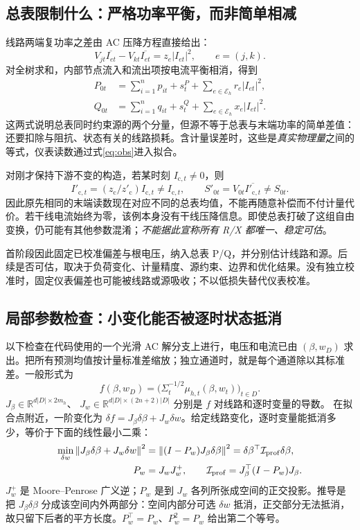 \documentclass[UTF8,fontset=fandol,11pt,a4paper]{ctexart}
\newcommand{\R}{\mathbb R}
\newcommand{\norm}[1]{\left\lVert#1\right\rVert}
\begin{document}
\subsection{总表限制什么：严格功率平衡，而非简单相减}
线路两端复功率之差由 AC 压降方程直接给出：
\begin{equation}
 V_{jt}\overline{I_{et}}-V_{kt}\overline{I_{et}}
       =z_e|I_{et}|^2,\qquad e=(j,k).
 \label{eq:edgepower}
\end{equation}
对全树求和，内部节点流入和流出项按电流平衡相消，得到
\begin{align}
 P_{0t}&=\sum_{i=1}^n p_{it}+s_t^P
                    +\sum_{e\in\mathcal E_h}r_e|I_{et}|^2,\label{eq:masterP}\\
 Q_{0t}&=\sum_{i=1}^n q_{it}+s_t^Q
                    +\sum_{e\in\mathcal E_h}x_e|I_{et}|^2.\label{eq:masterQ}
\end{align}
这两式说明总表同时约束源的两个分量，但源不等于总表与末端功率的简单差值：还要扣除与阻抗、状态有关的线路损耗。含计量误差时，这些是\emph{真实物理量}之间的等式，仪表读数通过式\eqref{eq:obs}进入拟合。

对刚才保持下游不变的构造，若某时刻 $I_{\mathrm c,t}\ne0$，则
\[
 I'_{\mathrm c,t}=(z_{\mathrm c}/z'_{\mathrm c})I_{\mathrm c,t}\ne I_{\mathrm c,t},
 \qquad S'_{0t}=V_{0t}\overline{I'_{\mathrm c,t}}\ne S_{0t}.
\]
因此原先相同的末端读数现在对应不同的总表均值，不能再随意补偿而不付计量代价。若干线电流始终为零，该例本身没有干线压降信息。即使总表打破了这组自由变换，仍可能有其他参数混淆；\emph{不能据此宣称所有 R/X 都唯一、稳定可估}。

首阶段因此固定已校准偏差与根电压，纳入总表 P/Q，并分别估计线路和源。后续是否可估，取决于负荷变化、计量精度、源约束、边界和优化结果。没有独立校准时，固定仪表偏差也可能被线路或源吸收；不以低损失替代仪表校准。

\subsection{局部参数检查：小变化能否被逐时状态抵消}
以下检查在代码使用的一个光滑 AC 解分支上进行，电压和电流已由 $(\beta,w_D)$ 求出。把所有预测均值按计量标准差缩放；独立通道时，就是每个通道除以其标准差。一般形式为
\[
 f(\beta,w_D)=
   \bigl(\Sigma_t^{-1/2}\mu_{h,t}(\beta,w_t)\bigr)_{t\in D}.
\]
$J_\beta\in\R^{d|D|\times2m_h}$、
$J_w\in\R^{d|D|\times(2n+2)|D|}$ 分别是 $f$ 对线路和逐时变量的导数。
在拟合点附近，一阶变化为
$\delta f=J_\beta\delta\beta+J_w\delta w$。给定线路变化，逐时变量能抵消多少，等价于下面的线性最小二乘：
\begin{align}
 \min_{\delta w}\norm{J_\beta\delta\beta+J_w\delta w}^2
  &=\norm{(I-P_w)J_\beta\delta\beta}^2
    =\delta\beta^\top\mathcal I_{\rm prof}\delta\beta,\label{eq:projection}\\
 P_w&=J_wJ_w^+,\qquad
 \mathcal I_{\rm prof}=J_\beta^\top(I-P_w)J_\beta.
 \label{eq:information}
\end{align}
$J_w^+$ 是 Moore--Penrose 广义逆；$P_w$ 是到 $J_w$ 各列所张成空间的正交投影。推导是把 $J_\beta\delta\beta$ 分成该空间内外两部分：空间内部分可选 $\delta w$ 抵消，正交部分无法抵消，故只留下后者的平方长度。$P_w^\top=P_w$、$P_w^2=P_w$ 给出第二个等号。
\end{document}
